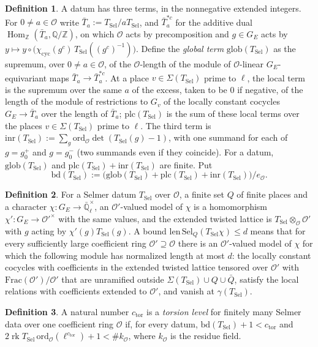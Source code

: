 \documentclass[reqno]{amsart}
\theoremstyle{definition}
\newtheorem{definition}{Definition}[section]
\theoremstyle{plain}
\newcommand{\Z}{\mathbb{Z}}
\newcommand{\Q}{\mathbb{Q}}
\newcommand{\Ql}{\bar{\mathbb{Q}}_\ell}
\newcommand{\Sel}{\mathrm{Sel}}
\newcommand{\ord}{\mathrm{ord}}
\newcommand{\rk}{\operatorname{rk}}
\newcommand{\Oc}{\mathcal{O}}
\newcommand{\bd}{\mathrm{bd}}
\newcommand{\TS}{T_{\mathrm{Sel}}}
\newcommand{\ctor}{c_{\mathrm{tor}}}
\begin{document}
\begin{definition}
A datum has three terms, in the nonnegative extended integers.  For \(0 \ne a \in \Oc\) write \(\bar T_a := \TS/a\TS\), and \(\bar T_a^{*c}\) for the additive dual \(\operatorname{Hom}_{\Z}(\bar T_a, \Q/\Z)\), on which \(\Oc\) acts by precomposition and \(g \in G_E\) acts by \(y \mapsto y \circ \bigl(\chi_{\mathrm{cyc}}(g^c)\,\TS((g^c)^{-1})\bigr)\).  Define the \emph{global term} \(\mathrm{glob}(\TS)\) as the supremum, over \(0 \ne a \in \Oc\), of the \(\Oc\)-length of the module of \(\Oc\)-linear \(G_E\)-equivariant maps \(\bar T_a \to \bar T_a^{*c}\).  At a place \(v \in \Sigma(\TS)\) prime to \(\ell\), the local term is the supremum over the same \(a\) of the excess, taken to be \(0\) if negative, of the length of the module of restrictions to \(G_v\) of the locally constant cocycles \(G_E \to \bar T_a\) over the length of \(\bar T_a\); \(\mathrm{plc}(\TS)\) is the sum of these local terms over the places \(v \in \Sigma(\TS)\) prime to \(\ell\).  The third term is \(\mathrm{inr}(\TS) := \sum_g \ord_{\Oc}\det(\TS(g) - 1)\), with one summand for each of \(g = g_0^{+}\) and \(g = g_0^{-}\) (two summands even if they coincide).  For a datum, \(\mathrm{glob}(\TS)\) and \(\mathrm{plc}(\TS) + \mathrm{inr}(\TS)\) are finite.  Put
\[
  \bd(\TS) := \bigl(\mathrm{glob}(\TS) + \mathrm{plc}(\TS) + \mathrm{inr}(\TS)\bigr)/e_{\Oc} .
\]
\end{definition}

\begin{definition}\label{def:twisted-length}
For a Selmer datum \(\TS\) over \(\Oc\), a finite set \(Q\) of finite places and a character \(\chi\colon G_E \to \Ql^\times\), an \(\Oc'\)-valued model of \(\chi\) is a homomorphism \(\chi' \colon G_E \to \Oc'^\times\) with the same values, and the extended twisted lattice is \(\TS \otimes_{\Oc} \Oc'\) with \(g\) acting by \(\chi'(g)\TS(g)\).  A bound \(\mathrm{len}\,\Sel_Q(\TS\chi) \le d\) means that for every sufficiently large coefficient ring \(\Oc' \supseteq \Oc\) there is an \(\Oc'\)-valued model of \(\chi\) for which the following module has normalized length at most \(d\): the locally constant cocycles with coefficients in the extended twisted lattice tensored over \(\Oc'\) with \(\mathrm{Frac}(\Oc')/\Oc'\) that are unramified outside \(\Sigma(\TS) \cup Q \cup \bar Q\), satisfy the local relations with coefficients extended to \(\Oc'\), and vanish at \(\gamma(\TS)\).
\end{definition}

\begin{definition}\label{def:torsion-level}
A natural number \(\ctor\) is a \emph{torsion level} for finitely many Selmer data over one coefficient ring \(\Oc\) if, for every datum, \(\bd(\TS) + 1 < \ctor\) and \(2\rk \TS\,\ord_{\Oc}(\ell^{\ctor}) + 1 < \#k_{\Oc}\), where \(k_{\Oc}\) is the residue field.
\end{definition}
\end{document}
